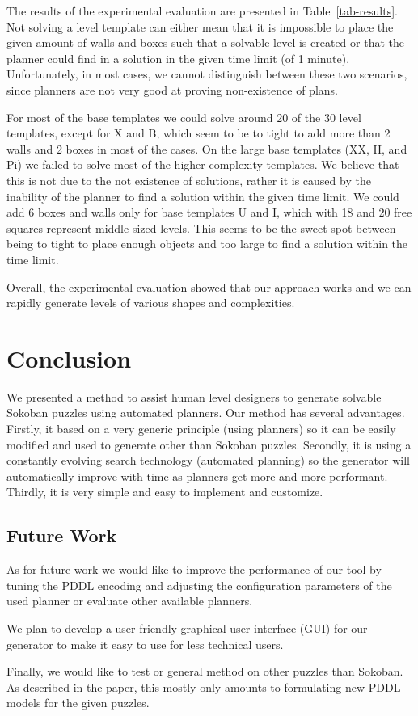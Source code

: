 \documentclass[runningheads]{llncs}
\begin{document}
The results of the experimental evaluation are presented in Table~\ref{tab-results}.
Not solving a level template can either mean that it is impossible to place the given amount of walls
and boxes such that a solvable level is created or that the planner could find in a solution in the given
time limit (of 1 minute). Unfortunately, in most cases, we cannot distinguish between these two scenarios,
since planners are not very good at proving non-existence of plans.

For most of the base templates we could solve around 20 of the 30 level templates, except for X and B,
which seem to be to tight to add more than 2 walls and 2 boxes in most of the cases.
On the large base templates (XX, II, and Pi) we failed to solve most of the higher complexity templates. We
believe that this is not due to the not existence of solutions, rather it is caused by the inability of
the planner to find a solution within the given time limit.
We could add 6 boxes and walls only for base templates U and I, which with 18 and 20 free squares
represent middle sized levels. This seems to be the sweet spot between being to tight to place
enough objects and too large to find a solution within the time limit.

Overall, the experimental evaluation showed that our approach works and we can rapidly
generate levels of various shapes and complexities. 

\section{Conclusion}
We presented a method to assist human level designers to generate solvable Sokoban
puzzles using automated planners. Our method has several advantages. Firstly,
it based on a very generic principle (using planners) so it can be easily modified and used
to generate other than Sokoban puzzles. Secondly, it is using a constantly
evolving search technology (automated planning) so the generator will automatically
improve with time as planners get more and more performant. Thirdly, it is very simple
and easy to implement and customize.

\subsection{Future Work}
As for future work we would like to improve the performance of our tool by tuning the PDDL
encoding and adjusting the configuration parameters of the used planner or evaluate
other available planners.

We plan to develop a user friendly graphical user interface (GUI) for our generator
to make it easy to use for less technical users.

Finally, we would like to test or general method on other puzzles than Sokoban. As described in
the paper, this mostly only amounts to formulating new PDDL models for the given puzzles.

%
%
%


%
\end{document}
